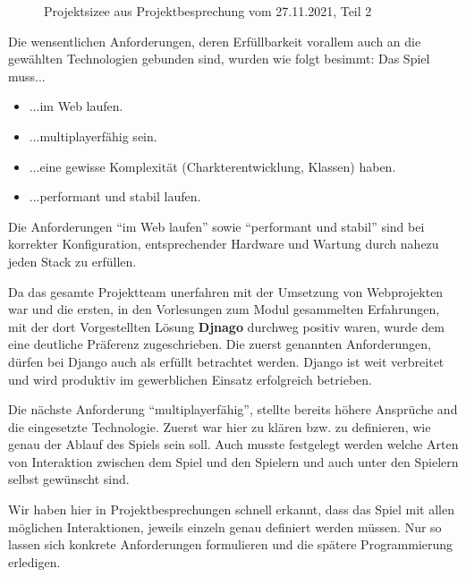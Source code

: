 \begin{figure}[H]
    \centering
    \caption{Projektsizee aus Projektbesprechung vom 27.11.2021, Teil 2}
    \label{fig:2021-11-27-projektskizze-2}
\end{figure}

Die wensentlichen Anforderungen, deren Erfüllbarkeit vorallem auch an die gewählten Technologien gebunden sind, wurden wie folgt besimmt: Das Spiel muss... \begin{itemize}
    \item ...im Web laufen.
    \item ...multiplayerfähig sein.
    \item ...eine gewisse Komplexität (Charkterentwicklung, Klassen) haben.
    \item ...performant und stabil laufen.
\end{itemize}


Die Anforderungen \enquote{im Web laufen} sowie \enquote{performant und stabil} sind bei korrekter Konfiguration, entsprechender Hardware und Wartung durch nahezu jeden \ac{Stack} zu erfüllen. 

Da das gesamte Projektteam unerfahren mit der Umsetzung von Webprojekten war und die ersten, in den Vorlesungen zum Modul gesammelten Erfahrungen, mit der dort Vorgestellten Lösung \textbf{Djnago} durchweg positiv waren, wurde dem eine deutliche Präferenz zugeschrieben. Die zuerst genannten Anforderungen, dürfen bei Django auch als erfüllt betrachtet werden. Django ist weit verbreitet und wird produktiv im gewerblichen Einsatz erfolgreich betrieben. 

Die nächste Anforderung \enquote{multiplayerfähig}, stellte bereits höhere Ansprüche and die eingesetzte Technologie. Zuerst war hier zu klären bzw. zu definieren, wie genau der Ablauf des Spiels sein soll. Auch musste festgelegt werden welche Arten von Interaktion zwischen dem Spiel und den Spielern und auch unter den Spielern selbst gewünscht sind. 

Wir haben hier in Projektbesprechungen schnell erkannt, dass das Spiel mit allen möglichen Interaktionen, jeweils einzeln genau definiert werden müssen. Nur so lassen sich konkrete Anforderungen formulieren und die spätere Programmierung erledigen. 

